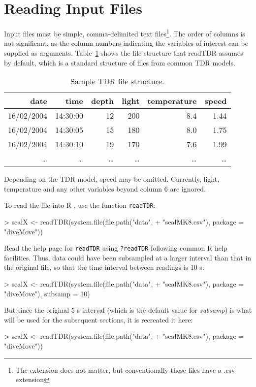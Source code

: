 \documentclass[12pt, letterpaper]{scrartcl}
\newcommand{\Rfunction}[1]{{\texttt{#1}}}
\newcommand{\Rfunarg}[1]{{\textit{#1}}}
\newcommand{\R}{{\normalfont\textsf{R }}{}}
\begin{document}
\section{Reading Input Files}
\label{sec:read-in}

Input files must be simple, comma-delimited text files\footnote{The
  extension does not matter, but conventionally these files have a .csv
  extension}.  The order of columns is not significant, as the column
numbers indicating the variables of interest can be supplied as arguments.
Table~\ref{tab:file-str} shows the file structure that readTDR assumes by
default, which is a standard structure of files from common TDR models.

\begin{table}[bt]
  \caption{Sample TDR file structure.}
  \centering
  \begin{tabular}{rrrrrr}\toprule
    date       & time     & depth  & light  & temperature & speed    \\\midrule
    16/02/2004 & 14:30:00 & 12     & 200    & 8.4         & 1.44     \\
    16/02/2004 & 14:30:05 & 15     & 180    & 8.0         & 1.75     \\
    16/02/2004 & 14:30:10 & 19     & 170    & 7.6         & 1.99     \\
    \ldots     & \ldots   & \ldots & \ldots & \ldots      & \ldots   \\\bottomrule
  \end{tabular}
  \label{tab:file-str}
\end{table}

Depending on the TDR model, speed may be omitted.  Currently, light,
temperature and any other variables beyond column 6 are ignored.

To read the file into \R{}, use the function \Rfunction{readTDR}:
\begin{Schunk}
\begin{Sinput}
> sealX <- readTDR(system.file(file.path("data", 
+     "sealMK8.csv"), package = "diveMove"))
\end{Sinput}
\end{Schunk}
Read the help page for \Rfunction{readTDR} using \verb|?readTDR| following
common \R{} help facilities.  Thus, data could have been subsampled at a
larger interval than that in the original file, so that the time interval
between readings is 10 s:
\begin{Schunk}
\begin{Sinput}
> sealX <- readTDR(system.file(file.path("data", 
+     "sealMK8.csv"), package = "diveMove"), subsamp = 10)
\end{Sinput}
\end{Schunk}
But since the original 5 s interval (which is the default value for
\Rfunarg{subsamp}) is what will be used for the subsequent sections, it is
recreated it here:
\begin{Schunk}
\begin{Sinput}
> sealX <- readTDR(system.file(file.path("data", 
+     "sealMK8.csv"), package = "diveMove"))
\end{Sinput}
\end{Schunk}
\end{document}
